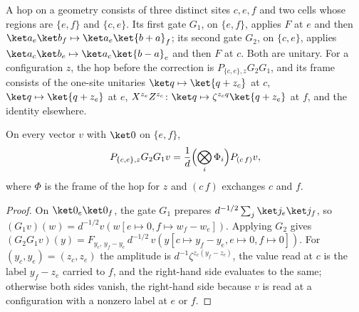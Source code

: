 \begin{definition}
    \label{def:teleport_hop}
    \leanok
    A hop on a geometry consists of three distinct sites $c,e,f$ and two cells
    whose regions are $\{e,f\}$ and $\{c,e\}$. Its first gate $G_1$, on
    $\{e,f\}$, applies $F$ at $e$ and then $\ket a_e\ket b_f\mapsto\ket
        a_e\ket{b+a}_f$; its second gate $G_2$, on $\{c,e\}$, applies $\ket
        a_c\ket b_e\mapsto\ket a_c\ket{b-a}_e$ and then $F$ at $c$. Both are
    unitary. For a configuration $z$, the hop before the correction is
    $P_{\{c,e\},z}G_2G_1$, and its frame consists of the one-site unitaries
    $\ket q\mapsto\ket{q+z_c}$ at $c$, $\ket q\mapsto\ket{q+z_e}$ at $e$,
    $X^{z_e}Z^{z_c}\colon\ket q\mapsto\zeta^{z_cq}\ket{q+z_e}$ at $f$, and the
    identity elsewhere.
\end{definition}

\begin{lemma}
    \label{lem:teleport_hop}
    \leanok
    On every vector $v$ with $\ket0$ on $\{e,f\}$,
    \[
        P_{\{c,e\},z}G_2G_1v=\frac1d\Bigl(\bigotimes_i\Phi_i\Bigr)P_{(c\,f)}v,
    \]
    where $\Phi$ is the frame of the hop for $z$ and $(c\,f)$ exchanges $c$
    and $f$.
\end{lemma}
\begin{proof}
    \leanok
    On $\ket0_e\ket0_f$, the gate $G_1$ prepares
    $d^{-1/2}\sum_j\ket j_e\ket j_f$, so
    $(G_1v)(w)=d^{-1/2}v(w[e\mapsto0,f\mapsto w_f-w_e])$. Applying $G_2$ gives
    $(G_2G_1v)(y)=F_{y_c,\,y_f-y_e}\,d^{-1/2}\,v(y[c\mapsto y_f-y_e,e\mapsto0,f\mapsto0])$.
    For $(y_c,y_e)=(z_c,z_e)$ the amplitude is
    $d^{-1}\zeta^{z_c(y_f-z_e)}$, the value read at $c$ is the label $y_f-z_e$
    carried to $f$, and the right-hand side evaluates to the same; otherwise
    both sides vanish, the right-hand side because $v$ is read at a
    configuration with a nonzero label at $e$ or $f$.
\end{proof}

